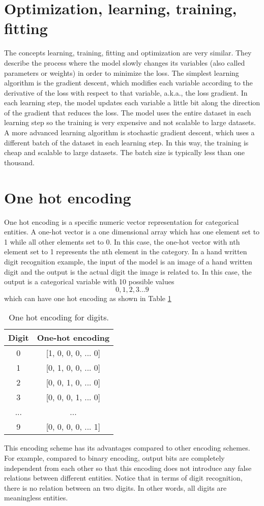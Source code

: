 \documentclass[12pt]{WSUThesis}
\theoremstyle{definition}
\begin{document}
\section{Optimization, learning, training, fitting}
The concepts learning, training, fitting and optimization are very similar. They describe the process where the model slowly changes its variables (also called parameters or weights) in order to minimize the loss. The simplest learning algorithm is the gradient descent, which modifies each variable according to the derivative of the loss with respect to that variable, a.k.a., the loss gradient.
In each learning step, the model updates each variable a little bit along the direction of the gradient that reduces the loss.
The model uses the entire dataset in each learning step so the training is very expensive and not scalable to large datasets.
A more advanced learning algorithm is stochastic gradient descent, which uses a different batch of the dataset in each learning step.
In this way, the training is cheap and scalable to large datasets.
The batch size is typically less than one thousand.

\section{One hot encoding}
One hot encoding is a specific numeric vector representation for categorical entities. A one-hot vector is a one dimensional array which has one element set to 1 while all other elements set to 0. In this case, the one-hot vector with nth element set to 1 represents the nth element in the category.
In a hand written digit recognition example, the input of the model is an image of a hand written digit and the output is the actual digit the image is related to.
In this case, the output is a categorical variable with 10 possible values
\[0, 1, 2, 3 ... 9\]
which can have one hot encoding as shown in Table \ref{tab:one-hot-encoding}
\begin{table}[ht]\centering
	\caption{One hot encoding for digits.}
	\begin{tabular}{cc} \hline \rowcolor{blue!30}
		Digit & One-hot encoding \\ \hline
		0 & [1, 0, 0, 0, ... 0]       \\ \hline
		1 & [0, 1, 0, 0, ... 0]       \\ \hline
		2 & [0, 0, 1, 0, ... 0]       \\ \hline
		3 & [0, 0, 0, 1, ... 0]       \\ \hline
		... & ...       \\ \hline
		9 & [0, 0, 0, 0, ... 1]       \\ \hline
	\end{tabular}
	\label{tab:one-hot-encoding}
\end{table}
This encoding scheme has its advantages compared to other encoding schemes. For example, compared to binary encoding, output bits are completely independent from each other so that this encoding does not introduce any false relations between different entities. Notice that in terms of digit recognition, there is no relation between an two digits. In other words, all digits are meaningless entities.
\end{document}
